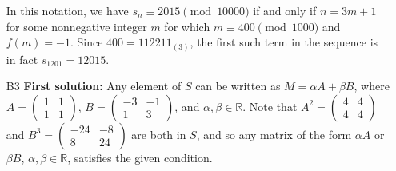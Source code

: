 \documentclass[amssymb,twocolumn,pra,10pt,aps]{revtex4-1}
\begin{document}
\begin{itemize}
In this notation, we have $s_n \equiv 2015 \pmod{10000}$ if and only if $n = 3m+1$
for some nonnegative integer $m$ for which
$m \equiv 400 \pmod{1000}$ and $f(m) = -1$.
Since $400 = 112211_{(3)}$, the first such term in the sequence is in fact $s_{1201} = 12015$.

\item[B3]
\textbf{First solution:}
Any element of $S$ can be written as $M = \alpha A + \beta B$, where $A = \left( \begin{smallmatrix} 1 & 1 \\ 1 & 1 \end{smallmatrix} \right)$, $B = \left( \begin{smallmatrix} -3 & -1 \\ 1 & 3 \end{smallmatrix} \right)$, and $\alpha,\beta \in \mathbb{R}$. Note that $A^2 = \left( \begin{smallmatrix} 4 & 4 \\ 4 & 4 \end{smallmatrix} \right)$ and
$B^3 = \left( \begin{smallmatrix} -24 & -8 \\ 8 & 24 \end{smallmatrix} \right)$ are both in $S$, and so any matrix of the form $\alpha A$ or $\beta B$, $\alpha,\beta\in\mathbb{R}$, satisfies the given condition.


\end{itemize}
\end{document}
